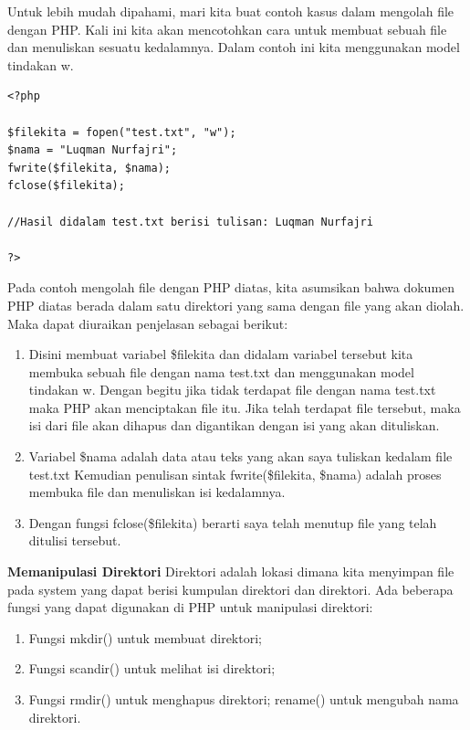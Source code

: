 Untuk lebih mudah dipahami, mari kita buat contoh kasus dalam mengolah file dengan PHP. Kali ini kita akan mencotohkan cara untuk membuat sebuah file dan menuliskan sesuatu kedalamnya. Dalam contoh ini kita menggunakan model tindakan w.

\begin{lstlisting}
<?php

$filekita = fopen("test.txt", "w");
$nama = "Luqman Nurfajri";
fwrite($filekita, $nama);
fclose($filekita);

//Hasil didalam test.txt berisi tulisan: Luqman Nurfajri

?>
\end{lstlisting} 
Pada contoh mengolah file dengan PHP diatas, kita asumsikan bahwa dokumen PHP diatas berada dalam satu direktori yang sama dengan file yang akan diolah. Maka dapat diuraikan penjelasan sebagai berikut:

\begin{enumerate}
\item Disini membuat variabel \$filekita dan didalam variabel tersebut kita membuka sebuah file dengan nama test.txt dan menggunakan model tindakan w. Dengan begitu jika tidak terdapat file dengan nama test.txt maka PHP akan menciptakan file itu. Jika telah terdapat file tersebut, maka isi dari file akan dihapus dan digantikan dengan isi yang akan dituliskan.
\item Variabel \$nama adalah data atau teks yang akan saya tuliskan kedalam file test.txt
Kemudian penulisan sintak fwrite(\$filekita, \$nama) adalah proses membuka file dan menuliskan isi kedalamnya.
\item Dengan fungsi fclose(\$filekita) berarti saya telah menutup file yang telah ditulisi tersebut.
\end{enumerate}

\textbf{Memanipulasi Direktori}
\newline
Direktori adalah lokasi dimana kita menyimpan file pada system yang dapat berisi kumpulan direktori dan direktori. Ada beberapa fungsi yang dapat digunakan di PHP untuk manipulasi direktori:
\begin{enumerate}
\item Fungsi mkdir() untuk membuat direktori;
\item Fungsi scandir() untuk melihat isi direktori;
\item Fungsi rmdir() untuk menghapus direktori;
\itemFungsi rename() untuk mengubah nama direktori.
\end{enumerate}


